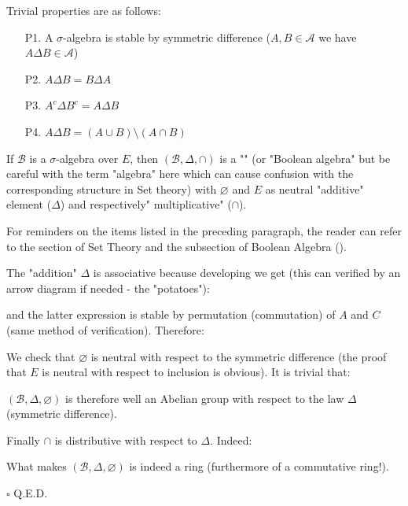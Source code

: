 	Trivial properties are as follows:
	\begin{enumerate}
		\item[P1.] A $\sigma$-algebra is stable by symmetric difference ($A,B\in \mathcal{A}$ we have $A\Delta B\in \mathcal{A}$)
		
		\item[P2.] $A\Delta B=B\Delta A$
		\item[P3.] $A^c\Delta B^c=A\Delta B$
			
		\item[P4.] $A\Delta B=(A\cup B)\setminus (A\cap B)$
	\end{enumerate}
	\begin{theorem}
	If $\mathcal{B}$ is a $\sigma$-algebra over $E$, then $(\mathcal{B},\Delta,\cap)$ is a "" (or "Boolean algebra" but be careful with the term "algebra" here which can cause confusion with the corresponding structure in Set theory) with $\varnothing$ and $E$ as neutral "additive" element ($\Delta$) and respectively" multiplicative" ($\cap$).
	\end{theorem}
	\begin{tcolorbox}[title=Remark,colframe=black,arc=10pt]
	For reminders on the items listed in the preceding paragraph, the reader can refer to the section of Set Theory and the subsection of Boolean Algebra ().
	\end{tcolorbox}	
	\begin{dem}
	The "addition" $\Delta$ is associative because developing we get (this can verified by an arrow diagram if needed - the "potatoes"):
	
	and the latter expression is stable by permutation (commutation) of $A$ and $C$ (same method of verification). Therefore:
	
	We check that $\varnothing$ is neutral with respect to the symmetric difference (the proof that $E$ is neutral with respect to inclusion is obvious). It is trivial that:
	
	$(\mathcal{B},\Delta,\varnothing)$ is therefore well an Abelian group with respect to the law $\Delta$ (symmetric difference).
	
	Finally $\cap$ is distributive with respect to $\Delta$. Indeed:
	
	What makes $(\mathcal{B},\Delta,\varnothing)$ is indeed a ring (furthermore of a commutative ring!).
	\begin{flushright}
		$\square$  Q.E.D.
	\end{flushright}
	\end{dem}


